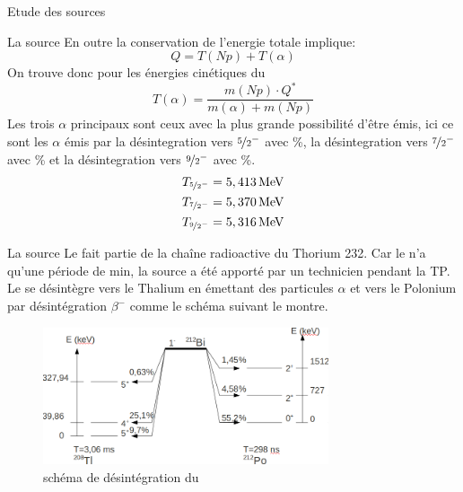 \documentclass[a4paper,11pt]{scrartcl}
\begin{document}
\begin{section}{Etude des sources}
\begin{subsection}{La source }
En outre la conservation de l'energie totale implique:
\begin{equation*}
Q=T(Np)+T(\alpha)
  \end{equation*}
On trouve donc pour les énergies cinétiques du    
\begin{equation*}
T(\alpha)=\frac{m(Np)\cdot Q^{\ast}}{m(\alpha)+m(Np)}
  \end{equation*}
   Les trois $\alpha$ principaux sont ceux avec la plus grande possibilité d'être émis, ici ce sont les $\alpha$ émis par la désintegration vers  $\nicefrac{5}{2}^-$ avec \unit[84,85]{\%}, la désintegration vers  $\nicefrac{7}{2}^-$ avec \unit[13,23]{\%} et la désintegration vers  $\nicefrac{9}{2}^-$ avec \unit[1,66]{\%}.
   \begin{eqnarray*}
    T_{\nicefrac{5}{2}^-}=\unit[5,413]{MeV}\\
    T_{\nicefrac{7}{2}^-}=\unit[5,370]{MeV}\\
    T_{\nicefrac{9}{2}^-}=\unit[5,316]{MeV}
\end{eqnarray*}
  \end{subsection}
 
  \begin{subsection}{La source }
   Le  fait partie de la chaîne radioactive du Thorium 232. Car le   n'a qu'une période de \unit[60,5]{min}, la source a été apporté par un technicien pendant la TP. Le  se désintègre vers le Thalium  en émettant des particules $\alpha$  et vers le Polonium par désintégration $\beta^-$ comme le schéma suivant le montre.
\begin{figure}[hbt]
     \begin{center}
      \includegraphics[width=0.75\textwidth]{Bilder/schemaBi1.png}
     \end{center}
     \caption{schéma de désintégration du  }
    \end{figure}


\end{subsection}
\end{section}
\end{document}
